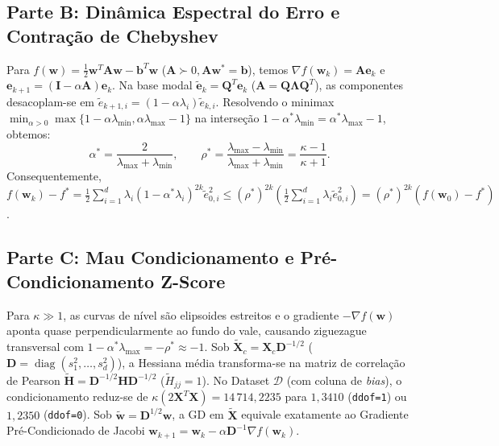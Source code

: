 \documentclass[11pt,a4paper]{article}
\begin{document}
\subsection{Parte B: Dinâmica Espectral do Erro e Contração de Chebyshev}
Para $f(\mathbf{w}) = \frac{1}{2}\mathbf{w}^T\mathbf{A}\mathbf{w} - \mathbf{b}^T\mathbf{w}$ ($\mathbf{A} \succ 0, \mathbf{A}\mathbf{w}^*=\mathbf{b}$), temos $\nabla f(\mathbf{w}_k) = \mathbf{A}\mathbf{e}_k$ e $\mathbf{e}_{k+1} = (\mathbf{I}-\alpha\mathbf{A})\mathbf{e}_k$. Na base modal $\tilde{\mathbf{e}}_k = \mathbf{Q}^T\mathbf{e}_k$ ($\mathbf{A}=\mathbf{Q}\boldsymbol{\Lambda}\mathbf{Q}^T$), as componentes desacoplam-se em $\tilde{e}_{k+1,i} = (1-\alpha\lambda_i)\tilde{e}_{k,i}$. Resolvendo o minimax $\min_{\alpha>0}\max\{1-\alpha\lambda_{\min}, \alpha\lambda_{\max}-1\}$ na interseção $1-\alpha^*\lambda_{\min} = \alpha^*\lambda_{\max}-1$, obtemos:
\[
\alpha^* = \frac{2}{\lambda_{\max} + \lambda_{\min}}, \qquad \rho^* = \frac{\lambda_{\max}-\lambda_{\min}}{\lambda_{\max}+\lambda_{\min}} = \frac{\kappa-1}{\kappa+1}.
\]
Consequentemente, $f(\mathbf{w}_k) - f^* = \frac{1}{2}\sum_{i=1}^d \lambda_i (1-\alpha^*\lambda_i)^{2k}\tilde{e}_{0,i}^2 \le (\rho^*)^{2k}\left(\frac{1}{2}\sum_{i=1}^d \lambda_i\tilde{e}_{0,i}^2\right) = (\rho^*)^{2k}(f(\mathbf{w}_0) - f^*)$.

\subsection{Parte C: Mau Condicionamento e Pré-Condicionamento Z-Score}
Para $\kappa \gg 1$, as curvas de nível são elipsoides estreitos e o gradiente $-\nabla f(\mathbf{w})$ aponta quase perpendicularmente ao fundo do vale, causando ziguezague transversal com $1 - \alpha^*\lambda_{\max} = -\rho^* \approx -1$. Sob $\tilde{\mathbf{X}}_c = \mathbf{X}_c\mathbf{D}^{-1/2}$ ($\mathbf{D} = \operatorname{diag}(s_1^2,\dots,s_d^2)$), a Hessiana média transforma-se na matriz de correlação de Pearson $\tilde{\mathbf{H}} = \mathbf{D}^{-1/2}\mathbf{H}\mathbf{D}^{-1/2}$ ($\tilde{H}_{jj}=1$). No Dataset $\mathcal{D}$ (com coluna de \textit{bias}), o condicionamento reduz-se de $\kappa(2\mathbf{X}^T\mathbf{X}) = 14\,714{,}2235$ para $1{,}3410$ (\texttt{ddof=1}) ou $1{,}2350$ (\texttt{ddof=0}). Sob $\tilde{\mathbf{w}} = \mathbf{D}^{1/2}\mathbf{w}$, a GD em $\tilde{\mathbf{X}}$ equivale exatamente ao Gradiente Pré-Condicionado de Jacobi $\mathbf{w}_{k+1} = \mathbf{w}_k - \alpha\mathbf{D}^{-1}\nabla f(\mathbf{w}_k)$.
\end{document}
